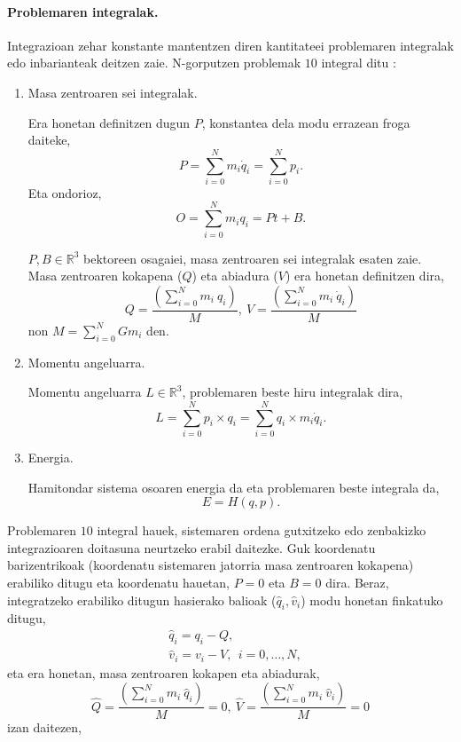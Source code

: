 \paragraph*{Problemaren integralak.}
Integrazioan zehar konstante mantentzen diren kantitateei problemaren integralak edo inbarianteak deitzen zaie. N-gorputzen problemak $10$ integral ditu \cite{Klioner2016}:
\begin{enumerate}


\item Masa zentroaren sei integralak.

Era honetan definitzen dugun $P$, konstantea dela modu errazean froga daiteke, 
\begin{equation*}
P=\sum_{i=0}^{N} m_i \dot{q}_i=\sum_{i=0}^{N} p_i. 
\end{equation*}
Eta ondorioz,
\begin{equation*}
O=\sum_{i=0}^{N} m_i {q}_i=Pt+B. 
\end{equation*}

$P,B \in \mathbb{R}^3$ bektoreen osagaiei, masa zentroaren sei integralak esaten zaie. Masa zentroaren kokapena ($Q$) eta abiadura ($V$)  era honetan definitzen dira, 
\begin{equation*}
Q=\frac{\left(\sum\limits_{i=0}^{N} m_i \ q_i\right)}{M}, \ V=\frac{\left(\sum\limits_{i=0}^{N} m_i \ \dot{q}_i\right)}{M}
\end{equation*}
non $M=\sum\limits_{i=0}^{N}Gm_i$ den.


\item Momentu angeluarra.

Momentu angeluarra $L\in \mathbb{R}^3$, problemaren beste hiru integralak dira, 
\begin{equation*}
L=\sum_{i=0}^{N} p_i \times q_i=\sum_{i=0}^{N} q_i \times m_i \dot{q}_i.
\end{equation*}

\item Energia.

Hamitondar sistema osoaren energia da eta problemaren beste integrala da,
\begin{equation*}
E=H(q,p).
\end{equation*}

\end{enumerate}

Problemaren $10$ integral hauek, sistemaren ordena gutxitzeko edo zenbakizko integrazioaren doitasuna neurtzeko erabil daitezke. Guk koordenatu barizentrikoak (koordenatu sistemaren jatorria masa zentroaren kokapena) erabiliko ditugu eta koordenatu hauetan, $P=0$ eta $B=0$ dira. Beraz, integratzeko erabiliko ditugun hasierako balioak ($\hat{q}_i,\hat{v}_i$) modu honetan finkatuko ditugu,
\begin{align*}
&\hat{q}_i=q_i-Q, \\
&\hat{v}_i=v_i-V, \ \ i=0,\dots,N,
\end{align*}
eta era honetan, masa zentroaren kokapen eta abiadurak,
\begin{equation*}
\hat{Q}=\frac{\left(\sum\limits_{i=0}^{N} m_i \ \hat{q}_i\right)}{M}=0, \ \hat{V}=\frac{\left(\sum\limits_{i=0}^{N} m_i \ \hat{v}_i\right)}{M}=0
\end{equation*}
izan daitezen,


